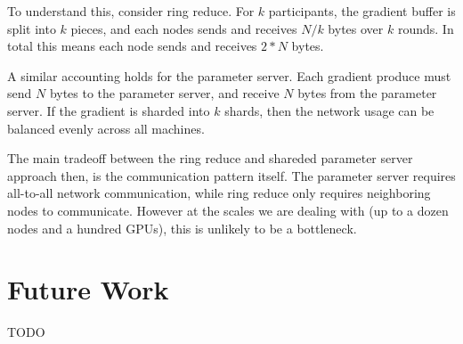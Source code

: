 \documentclass{article}
\begin{document}
To understand this, consider ring reduce. For $k$ participants, the gradient buffer is split into $k$ pieces, and each nodes sends and receives $N / k$ bytes over $k$ rounds. In total this means each node sends and receives $2 * N$ bytes.

A similar accounting holds for the parameter server. Each gradient produce must send $N$ bytes to the parameter server, and receive $N$ bytes from the parameter server. If the gradient is sharded into $k$ shards, then the network usage can be balanced evenly across all machines.

The main tradeoff between the ring reduce and shareded parameter server approach then, is the communication pattern itself. The parameter server requires all-to-all network communication, while ring reduce only requires neighboring nodes to communicate. However at the scales we are dealing with (up to a dozen nodes and a hundred GPUs), this is unlikely to be a bottleneck.





\section{Future Work}
{\color{red} TODO}


{
\footnotesize


}
\end{document}
